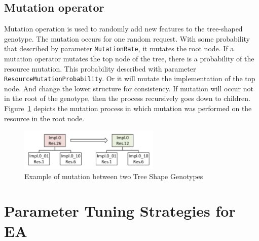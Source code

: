 \subsection{Mutation operator}
\label{sec:GeneticSolverMutation}
Mutation operation is used to randomly add new features to the tree-shaped genotype.
The mutation occurs for one random request. With some probability that described by parameter \texttt{MutationRate}, it mutates the root node. If a mutation operator mutates the top node of the tree, there is a probability of the resource mutation. This probability described with parameter \texttt{ResourceMutationProbability}. Or it will mutate the implementation of the top node. And change the lower structure for consistency. If mutation will occur not in the root of the genotype, then the process recursively goes down to children.  Figure~\ref{fig:GeneticSolverMutation} depicts the mutation process in which mutation was performed on the resource 
in the root node.

\begin{figure}
	\centering
	\includegraphics[width=0.6\textwidth]{images/GeneticSolverMutation.pdf}
	\caption[Mutation in Tree Shape Genotype]{Example of mutation between two Tree Shape Genotypes}
	\label{fig:GeneticSolverMutation}
\end{figure}

\section{Parameter Tuning Strategies for EA}\label{sec:Parameter Tuning Strategies}

